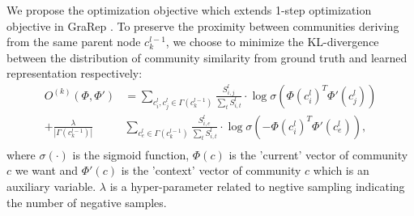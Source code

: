 \documentclass{article}
\theoremstyle{definition}
\newtheorem{defn}{Definition}
\begin{document}
		We propose the optimization objective which extends 1-step optimization objective in GraRep \cite{Cao2015GraRep}.
		To preserve the proximity between communities deriving from the same parent node $c_k^{l-1}$, we choose to minimize the KL-divergence between the distribution of community similarity from ground truth and learned representation respectively: 
		\begin{equation}
		\label{equ:local_loss} 
		\begin{split}
		O^{(k)}(\Phi, \Phi') & = \sum_{c_i^l, c_j^l \in \Gamma(c_k^{l-1})} \frac{S_{i,j}^l}{\sum_t S_{i, t}^l} \cdot \log{\sigma(\Phi(c_i^l)^T \Phi'(c_j^l))} \\
		+ \frac{\lambda}{|\Gamma(c_k^{l-1})|}&\sum_{c_e^l \in \Gamma(c_k^{l-1})} \frac{S_{i, e}^l}{\sum_t S_{i, t}^l} \cdot \log{\sigma(-\Phi(c_i^l)^T \Phi'(c_e^l))}, \\
		\end{split}
		\end{equation}
		where $\sigma(\cdot)$ is the sigmoid function, $\Phi(c)$ is the 'current' vector of community $c$ we want and $\Phi'(c)$ is the 'context' vector of community $c$ which is an auxiliary variable.
		$\lambda$ is a hyper-parameter related to negtive sampling indicating the number of negative samples\cite{Cao2015GraRep}.
\end{document}
